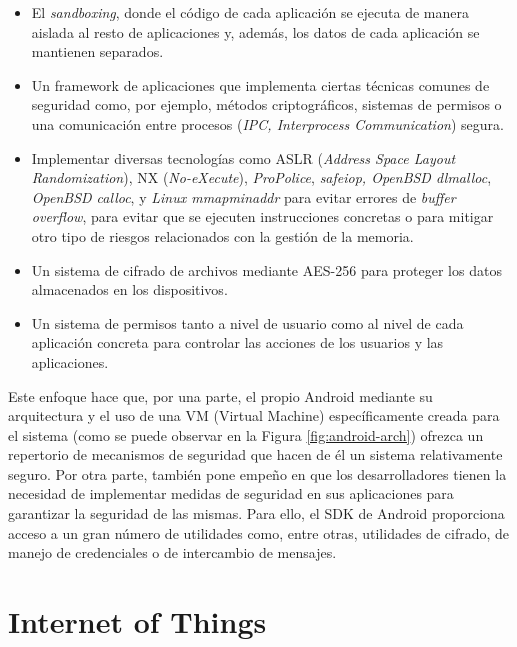 \begin{itemize}
	\item El \emph{sandboxing}, donde el código de cada aplicación se ejecuta de manera aislada al resto de aplicaciones y, además, los datos de cada aplicación se mantienen separados. 
	\item Un framework de aplicaciones que implementa ciertas técnicas comunes de seguridad como, por ejemplo, métodos criptográficos, sistemas de permisos o una comunicación entre procesos (\textit{IPC, Interprocess Communication}) segura.	
	\item Implementar diversas tecnologías como ASLR (\textit{Address Space Layout Randomization}), NX (\textit{No-eXecute}), \textit{ProPolice}, \textit{safe\textunderscore iop, OpenBSD dlmalloc}, \textit{OpenBSD calloc}, y \textit{Linux mmap\textunderscore min\textunderscore addr} para evitar errores de \textit{buffer overflow}, para evitar que se ejecuten instrucciones concretas o para mitigar otro tipo de riesgos relacionados con la gestión de la memoria.
	\item Un sistema de cifrado de archivos mediante AES-256 para proteger los datos almacenados en los dispositivos.
	\item Un sistema de permisos tanto a nivel de usuario como al nivel de cada aplicación concreta para controlar las acciones de los usuarios y las aplicaciones.
\end{itemize}

Este enfoque hace que, por una parte, el propio Android mediante su arquitectura y el uso de una VM (Virtual Machine) específicamente creada para el sistema (como se puede observar en la Figura \ref{fig:android-arch}) ofrezca un repertorio de mecanismos de seguridad que hacen de él un sistema relativamente seguro. Por otra parte, también pone empeño en que los desarrolladores tienen la necesidad de implementar medidas de seguridad en sus aplicaciones para garantizar la seguridad de las mismas. Para ello, el SDK de Android proporciona acceso a un gran número de utilidades como, entre otras, utilidades de cifrado, de manejo de credenciales o de intercambio de mensajes.


\section{Internet of Things}

